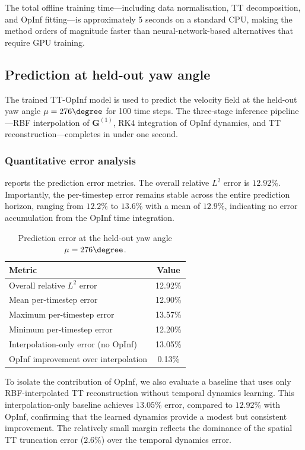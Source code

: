 \documentclass[12pt]{article}
\newcommand{\mat}[1]{\mathbf{#1}}
\begin{document}
The total offline training time---including data normalisation, TT decomposition, and OpInf fitting---is approximately 5 seconds on a standard CPU, making the method orders of magnitude faster than neural-network-based alternatives that require GPU training.

\subsection{Prediction at held-out yaw angle}
\label{sec:test_results}

The trained TT-OpInf model is used to predict the velocity field at the held-out yaw angle $\mu = 276\degree$ for 100 time steps.
The three-stage inference pipeline---RBF interpolation of $\mat{G}^{(1)}$, RK4 integration of OpInf dynamics, and TT reconstruction---completes in under one second.

\subsubsection{Quantitative error analysis}

 reports the prediction error metrics.
The overall relative $L^2$ error is $12.92\%$.
Importantly, the per-timestep error remains stable across the entire prediction horizon, ranging from $12.2\%$ to $13.6\%$ with a mean of $12.9\%$, indicating no error accumulation from the OpInf time integration.

\begin{table}[t]
\centering
\caption{Prediction error at the held-out yaw angle $\mu = 276\degree$.}
\label{tab:error_summary}
\begin{tabular}{lc}
\toprule
\textbf{Metric} & \textbf{Value} \\
\midrule
Overall relative $L^2$ error & 12.92\% \\
Mean per-timestep error & 12.90\% \\
Maximum per-timestep error & 13.57\% \\
Minimum per-timestep error & 12.20\% \\
\midrule
Interpolation-only error (no OpInf) & 13.05\% \\
OpInf improvement over interpolation & 0.13\% \\
\bottomrule
\end{tabular}
\end{table}

To isolate the contribution of OpInf, we also evaluate a baseline that uses only RBF-interpolated TT reconstruction without temporal dynamics learning.
This interpolation-only baseline achieves $13.05\%$ error, compared to $12.92\%$ with OpInf, confirming that the learned dynamics provide a modest but consistent improvement.
The relatively small margin reflects the dominance of the spatial TT truncation error ($2.6\%$) over the temporal dynamics error.
\end{document}
